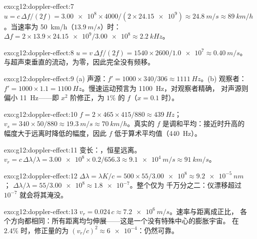 \begin{solution}{exo:g12:doppler-effect:7}
$u = c\,\Delta f/(2f) = \num{3.00e8} \times 4000/(2 \times \num{24.15e9}) \approx
\qty{24.8}{m/s} \approx \qty{89}{km/h}$。当速率为 \qty{50}{km/h}（$\qty{13.9}{m/s}$）时：
$\Delta f = 2 \times 13.9 \times \num{24.15e9}/\num{3.00e8} \approx \qty{2.2}{kHz}$。
\end{solution}

\begin{solution}{exo:g12:doppler-effect:8}
$u = v\,\Delta f/(2f) = 1540 \times 2600/\num{1.0e7} \approx \qty{0.40}{m/s}$。
与超声束垂直的流动，为零，因此完全没有频移。
\end{solution}

\begin{solution}{exo:g12:doppler-effect:9}
(a) 声源：$f' = 1000 \times 340/306 \approx \qty{1111}{Hz}$。(b) 观察者：
$f' = 1000 \times 1.1 = \qty{1100}{Hz}$。慢速运动预言为 \qty{1100}{Hz}，对观察者精确，
对声源则偏小 \qty{11}{Hz}——即 $x^2$ 阶修正，为 $1\%$
的 $f$（$x = 0.1$ 时）。
\end{solution}

\begin{solution}{exo:g12:doppler-effect:10}
$f = 2 \times 465 \times 415/880 \approx \qty{439}{Hz}$；
$v_s = 340 \times 50/880 \approx \qty{19.3}{m/s} \approx \qty{70}{km/h}$。真实的 $f$
是调和平均：接近时升高的幅度大于远离时降低的幅度，因此
$f$ 低于算术平均值（\qty{440}{Hz}）。
\end{solution}

\begin{solution}{exo:g12:doppler-effect:11}
变长：，恒星远离。$v_r = c\,\Delta\lambda/\lambda =
\num{3.00e8} \times 0.2/656.3 \approx \qty{9.1e4}{m/s} \approx \qty{91}{km/s}$。
\end{solution}

\begin{solution}{exo:g12:doppler-effect:12}
$\Delta\lambda = \lambda K/c = 500 \times 55/\num{3.00e8} \approx \qty{9.2e-5}{nm}$；
$\Delta\lambda/\lambda = 55/\num{3.00e8} \approx \num{1.8e-7}$。整个仅为
千万分之二：仪漂移超过 $10^{-7}$ 就会将其淹没。
\end{solution}

\begin{solution}{exo:g12:doppler-effect:13}
$v_r = 0.024\,c \approx \qty{7.2e6}{m/s}$。速率与距离成正比，
各个方向都相同：所有距离均匀伸展——这是一个没有特殊中心的膨胀宇宙。
在 $2.4\%$ 时，修正量的为 $(v_r/c)^2 \approx
\num{6e-4}$：仍然可靠。
\end{solution}


